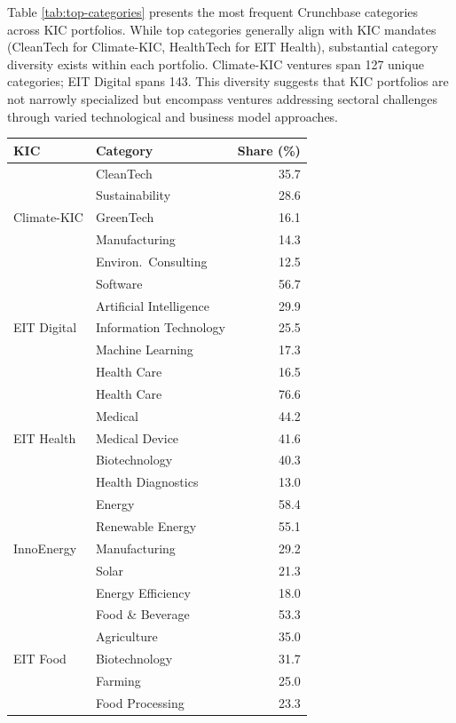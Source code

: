 \documentclass[../main.tex]{subfiles}
\begin{document}
Table \ref{tab:top-categories} presents the most frequent Crunchbase categories across KIC portfolios. While top categories generally align with KIC mandates (CleanTech for Climate-KIC, HealthTech for EIT Health), substantial category diversity exists within each portfolio. Climate-KIC ventures span 127 unique categories; EIT Digital spans 143. This diversity suggests that KIC portfolios are not narrowly specialized but encompass ventures addressing sectoral challenges through varied technological and business model approaches.

\begin{center}
\small
\begin{tabular}{llr}
\toprule
\textbf{KIC} & \textbf{Category} & \textbf{Share (\%)} \\
\midrule
\multirow{5}{*}{Climate-KIC}
    & CleanTech & 35.7 \\
    & Sustainability & 28.6 \\
    & GreenTech & 16.1 \\
    & Manufacturing & 14.3 \\
    & Environ.\ Consulting & 12.5 \\
\midrule
\multirow{5}{*}{EIT Digital}
    & Software & 56.7 \\
    & Artificial Intelligence & 29.9 \\
    & Information Technology & 25.5 \\
    & Machine Learning & 17.3 \\
    & Health Care & 16.5 \\
\midrule
\multirow{5}{*}{EIT Health}
    & Health Care & 76.6 \\
    & Medical & 44.2 \\
    & Medical Device & 41.6 \\
    & Biotechnology & 40.3 \\
    & Health Diagnostics & 13.0 \\
\midrule
\multirow{5}{*}{InnoEnergy}
    & Energy & 58.4 \\
    & Renewable Energy & 55.1 \\
    & Manufacturing & 29.2 \\
    & Solar & 21.3 \\
    & Energy Efficiency & 18.0 \\
\midrule
\multirow{5}{*}{EIT Food}
    & Food \& Beverage & 53.3 \\
    & Agriculture & 35.0 \\
    & Biotechnology & 31.7 \\
    & Farming & 25.0 \\
    & Food Processing & 23.3 \\
\bottomrule
\end{tabular}
\end{center}
\end{document}
